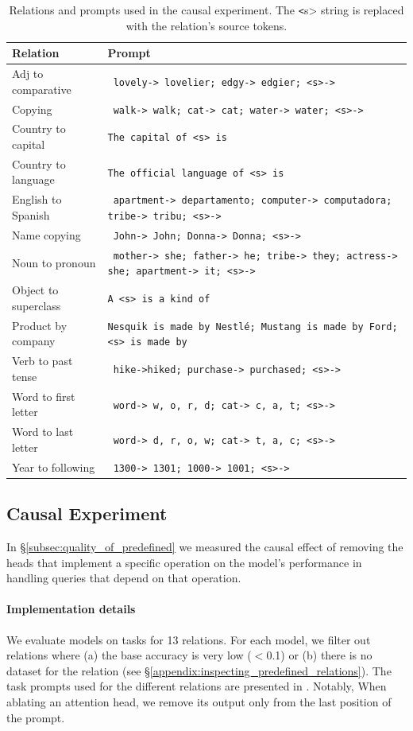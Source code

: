 \documentclass[11pt]{article}
\begin{document}
\begin{table}[htbp]
\centering
\footnotesize
\begin{tabular}{ll}
\toprule
Relation & Prompt \\
\midrule
Adj to comparative & \texttt{ lovely-> lovelier; edgy-> edgier; <s>->} \\
Copying & \texttt{ walk-> walk; cat-> cat; water-> water; <s>->} \\
Country to capital & \texttt{The capital of <s> is} \\
Country to language & \texttt{The official language of <s> is} \\
English to Spanish & \texttt{ apartment-> departamento; computer-> computadora; tribe-> tribu; <s>->} \\
Name copying & \texttt{ John-> John; Donna-> Donna; <s>->} \\
Noun to pronoun & \texttt{ mother-> she; father-> he; tribe-> they; actress-> she; apartment-> it; <s>->} \\
Object to superclass & \texttt{A <s> is a kind of} \\
Product by company & \texttt{Nesquik is made by Nestlé; Mustang is made by Ford; <s> is made by} \\
Verb to past tense & \texttt{ hike->hiked; purchase-> purchased; <s>->} \\
Word to first letter & \texttt{ word-> w, o, r, d; cat-> c, a, t; <s>->} \\
Word to last letter & \texttt{ word-> d, r, o, w; cat-> t, a, c; <s>->} \\
Year to following & \texttt{ 1300-> 1301; 1000-> 1001; <s>->} \\
\bottomrule
\end{tabular}
\caption{Relations and prompts used in the causal experiment. The \texttt<s> string is replaced with the relation's source tokens. 
} 
\label{tab:causal_experiment_prompts}
\end{table}


\subsection{Causal Experiment}
\label{appendix:causal_validation}
In \S\ref{subsec:quality_of_predefined} we measured the causal effect of removing the heads that implement a specific operation on the model's performance in handling queries that depend on that operation. 

\paragraph{Implementation details}
We evaluate models on
tasks for 13 relations. For each model, we filter out relations where (a) the base accuracy is very low ($<$0.1) or (b) there is no dataset for the relation (see \S\ref{appendix:inspecting_predefined_relations}). 
The task prompts used for the different relations are presented in . 
Notably, When ablating an attention head, we remove its output only from the last position of the prompt.
\end{document}
